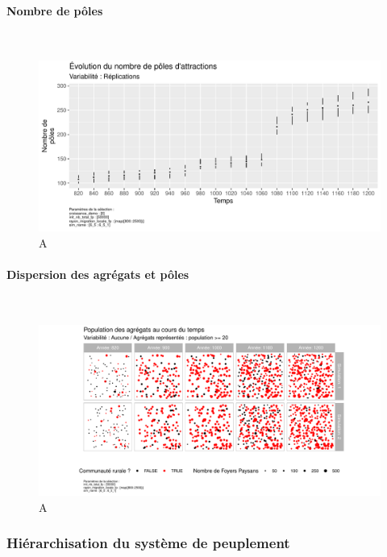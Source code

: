 \paragraph{Nombre de pôles}~\\

\begin{figure}[H]
	\centering
	\includegraphics[width=\linewidth]{img/results_6_5_1/Poles_Nb_Haut.pdf}
	\caption{A}
	\label{}
\end{figure}

\paragraph{Dispersion des agrégats et pôles}~\\

\begin{figure}[H]
	\centering
	\includegraphics[width=\linewidth]{img/results_6_5_1/Agregats_Carte_Haut.pdf}
	\caption{A}
	\label{}
\end{figure}


\subsubsection{Hiérarchisation du système de peuplement}


